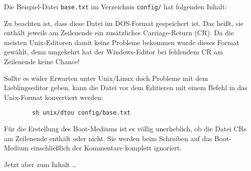 
Die Beispiel-Datei \verb+base.txt+ im Verzeichnis \verb+config/+ hat
folgenden Inhalt:

\begin{example}
\end{example}

\medskip

Zu beachten ist, dass diese Datei im DOS-Format gespeichert ist. Das
heißt, sie enthält jeweils am Zeilenende ein zusätzliches
Carriage-Return (CR). Da die meisten Unix-Editoren damit keine
Probleme bekommen wurde dieses Format gewählt, denn
umgekehrt hat der Windows-Editor bei fehlendem CR am Zeilenende keine
Chance!

Sollte es wider Erwarten unter Unix/Linux doch Probleme mit dem
Lieblingseditor geben, kann die Datei vor dem Editieren mit einem
Befehl in das Unix-Format konvertiert werden:

\begin{example}
\begin{verbatim}
        sh unix/dtou config/base.txt
\end{verbatim}
\end{example}

Für die Erstellung des Boot-Mediums ist es völlig unerheblich, ob die
Datei CRs am Zeilenende enthält oder nicht. Sie werden beim Schreiben
auf das Boot-Medium einschließlich der Kommentare komplett ignoriert.

Jetzt aber zum Inhalt \ldots
